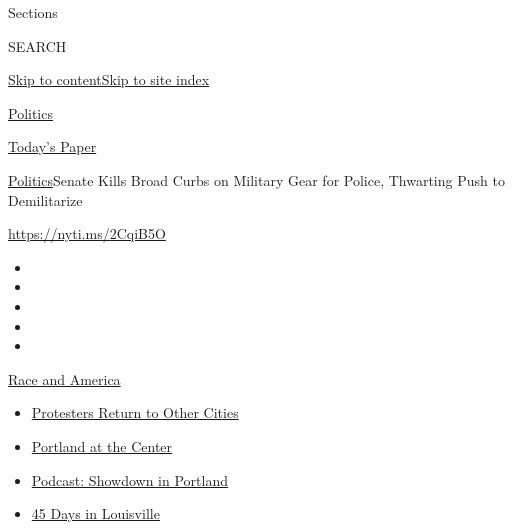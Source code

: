 Sections

SEARCH

\protect\hyperlink{site-content}{Skip to
content}\protect\hyperlink{site-index}{Skip to site index}

\href{https://www.nytimes.com/section/politics}{Politics}

\href{https://myaccount.nytimes.com/auth/login?response_type=cookie\&client_id=vi}{}

\href{https://www.nytimes.com/section/todayspaper}{Today's Paper}

\href{/section/politics}{Politics}\textbar{}Senate Kills Broad Curbs on
Military Gear for Police, Thwarting Push to Demilitarize

\url{https://nyti.ms/2CqiB5O}

\begin{itemize}
\item
\item
\item
\item
\item
\end{itemize}

\href{https://www.nytimes.com/news-event/george-floyd-protests-minneapolis-new-york-los-angeles?action=click\&pgtype=Article\&state=default\&region=TOP_BANNER\&context=storylines_menu}{Race
and America}

\begin{itemize}
\tightlist
\item
  \href{https://www.nytimes.com/2020/07/26/us/protests-portland-seattle-trump.html?action=click\&pgtype=Article\&state=default\&region=TOP_BANNER\&context=storylines_menu}{Protesters
  Return to Other Cities}
\item
  \href{https://www.nytimes.com/2020/07/24/us/portland-oregon-protests-white-race.html?action=click\&pgtype=Article\&state=default\&region=TOP_BANNER\&context=storylines_menu}{Portland
  at the Center}
\item
  \href{https://www.nytimes.com/2020/07/23/podcasts/the-daily/portland-protests.html?action=click\&pgtype=Article\&state=default\&region=TOP_BANNER\&context=storylines_menu}{Podcast:
  Showdown in Portland}
\item
  \href{https://www.nytimes.com/interactive/2020/07/16/us/black-lives-matter-protests-louisville-breonna-taylor.html?action=click\&pgtype=Article\&state=default\&region=TOP_BANNER\&context=storylines_menu}{45
  Days in Louisville}
\end{itemize}

